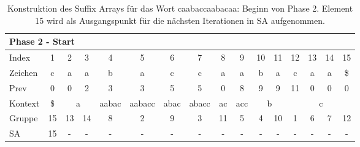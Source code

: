 \begin{table}[H]
\centering
\begin{adjustbox}{max width=\textwidth}
\centering
\begin{tabular}{lccccccccccccccc}
\multicolumn{16}{l}{Phase 2 - Start}                                                                                                                                                                                                                                                                                  \\ \hline
\multicolumn{1}{l|}{Index}   & 1                       & 2  & 3                       & 4                          & 5                           & 6                         & 7                          & 8                       & 9                        & 10 & 11                      & 12  & 13  & 14  & 15  \\
\multicolumn{1}{l|}{Zeichen} & c                       & a  & a                       & b                          & a                           & c                         & c                          & a                       & a                        & b  & a                       & c   & a   & a   & \$  \\
\multicolumn{1}{l|}{Prev}    & 0                       & 0  & 2                       & 3                          & 3                           & 5                         & 5                          & 0                       & 8                        & 9  & 9                       & 11  & 0   & 0   & 0   \\ \hline
\multicolumn{1}{l|}{Kontext} & \multicolumn{1}{c|}{\$} & \multicolumn{2}{c|}{a}       & \multicolumn{1}{c|}{aabac} & \multicolumn{1}{c|}{aabacc} & \multicolumn{1}{c|}{abac} & \multicolumn{1}{c|}{abacc} & \multicolumn{1}{c|}{ac} & \multicolumn{1}{c|}{acc} & \multicolumn{2}{c|}{b}       & \multicolumn{4}{c}{c} \\
\multicolumn{1}{l|}{Gruppe}  & \multicolumn{1}{c|}{15} & 13 & \multicolumn{1}{c|}{14} & \multicolumn{1}{c|}{8}     & \multicolumn{1}{c|}{2}      & \multicolumn{1}{c|}{9}    & \multicolumn{1}{c|}{3}     & \multicolumn{1}{c|}{11} & \multicolumn{1}{c|}{5}   & 4  & \multicolumn{1}{c|}{10} & 1   & 6   & 7   & 12  \\
\multicolumn{1}{l|}{SA}      & \multicolumn{1}{c|}{15} & -  & \multicolumn{1}{c|}{-}  & \multicolumn{1}{c|}{-}     & \multicolumn{1}{c|}{-}      & \multicolumn{1}{c|}{-}    & \multicolumn{1}{c|}{-}     & \multicolumn{1}{c|}{-}  & \multicolumn{1}{c|}{-}   & -  & \multicolumn{1}{c|}{-}  & -   & -   & -   & -  
\end{tabular}
\end{adjustbox}

\caption[Konstruktion des Suffix Arrays f{\"u}r das Wort caabaccaabacaa: Beginn von Phase 2]{Konstruktion des Suffix Arrays f{\"u}r das Wort caabaccaabacaa: Beginn von Phase 2. Element 15 wird als Ausgangspunkt f{\"u}r die n{\"a}chsten Iterationen in SA aufgenommen.}
\label{table_complex_example_2_start} 
\end{table}

